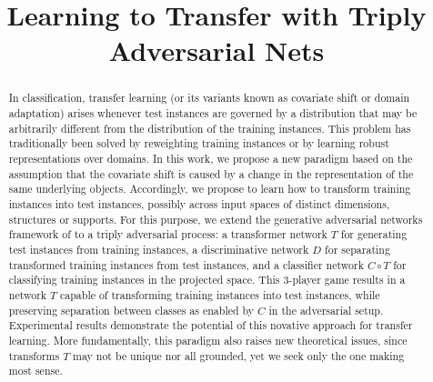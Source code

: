 \documentclass[aoas,preprint,authoryear]{imsart}
\begin{document}
\begin{frontmatter}
\title{Learning to Transfer with Triply Adversarial Nets}


\author{ }

\begin{abstract}

In classification, transfer learning (or its variants known as
covariate shift or domain adaptation) arises whenever test instances are
governed by a distribution that may be arbitrarily different from the
distribution of the training instances. This problem has traditionally been
solved by reweighting training instances or by learning robust representations
over domains. In this work, we propose a new paradigm based on the assumption
that the covariate shift is caused by a change in the representation of the same
underlying objects. Accordingly, we propose to learn how to transform training
instances into test instances, possibly across input spaces of distinct
dimensions, structures or supports. For this purpose, we extend the generative
adversarial networks framework of \cite{goodfellow2014generative} to a triply
adversarial process: a transformer network $T$ for generating test instances
from training instances, a discriminative network $D$ for separating transformed
training instances from test instances, and a classifier network $C \circ T$ for
classifying training instances in the projected space. This 3-player game
results in a network $T$ capable of transforming training instances into test
instances, while preserving separation between classes as enabled by $C$ in the
adversarial setup. Experimental results demonstrate the potential of this
novative approach for transfer learning.  More fundamentally, this paradigm also
raises new theoretical issues, since transforms $T$  may not be unique nor all
grounded, yet we seek only the one making most sense.

\end{abstract}

\end{frontmatter}
\end{document}
